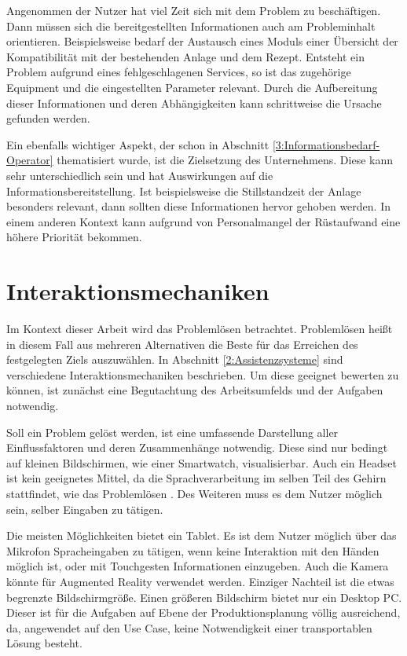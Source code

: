 Angenommen der Nutzer hat viel Zeit sich mit dem Problem zu beschäftigen. Dann müssen sich die bereitgestellten Informationen auch am Probleminhalt orientieren. Beispielsweise bedarf der Austausch eines Moduls einer Übersicht der Kompatibilität mit der bestehenden Anlage und dem Rezept. Entsteht ein Problem aufgrund eines fehlgeschlagenen Services, so ist das zugehörige Equipment und die eingestellten Parameter relevant. Durch die Aufbereitung dieser Informationen und deren Abhängigkeiten kann schrittweise die Ursache gefunden werden.

Ein ebenfalls wichtiger Aspekt, der schon in Abschnitt \ref{3:Informationsbedarf-Operator} thematisiert wurde, ist die Zielsetzung des Unternehmens. Diese kann sehr unterschiedlich sein und hat Auswirkungen auf die Informationsbereitstellung. Ist beispielsweise die Stillstandzeit der Anlage besonders relevant, dann sollten diese Informationen hervor gehoben werden. In einem anderen Kontext kann aufgrund von Personalmangel der Rüstaufwand eine höhere Priorität bekommen.

\section{Interaktionsmechaniken}
Im Kontext dieser Arbeit wird das Problemlösen betrachtet. Problemlösen heißt in diesem Fall aus mehreren Alternativen die Beste für das Erreichen des festgelegten Ziels auszuwählen. In Abschnitt \ref{2:Assistenzsysteme} sind verschiedene Interaktionsmechaniken beschrieben. Um diese geeignet bewerten zu können, ist zunächst eine Begutachtung des Arbeitsumfelds und der Aufgaben notwendig.

Soll ein Problem gelöst werden, ist eine umfassende Darstellung aller Einflussfaktoren und deren Zusammenhänge notwendig. Diese sind nur bedingt auf kleinen Bildschirmen, wie einer Smartwatch, visualisierbar. Auch ein Headset ist kein geeignetes Mittel, da die Sprachverarbeitung im selben Teil des Gehirn stattfindet, wie das Problemlösen \cite{Zuhlke2012}. Des Weiteren muss es dem Nutzer möglich sein, selber Eingaben zu tätigen. 

Die meisten Möglichkeiten bietet ein Tablet. Es ist dem Nutzer möglich über das Mikrofon Spracheingaben zu tätigen, wenn keine Interaktion mit den Händen möglich ist, oder mit Touchgesten Informationen einzugeben. Auch die Kamera könnte für Augmented Reality verwendet werden. Einziger Nachteil ist die etwas begrenzte Bildschirmgröße. Einen größeren Bildschirm bietet nur ein Desktop PC. Dieser ist für die Aufgaben auf Ebene der Produktionsplanung völlig ausreichend, da, angewendet auf den Use Case, keine Notwendigkeit einer transportablen Lösung besteht.

